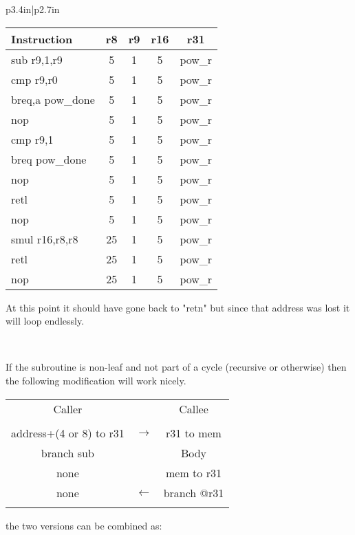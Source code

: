 \begin{tabular}{p{3.4in}|p{2.7in}}
\begin{tabular}{lcccc}
  Instruction & r8 & r9 & r16 & r31 \\ \hline
  sub r9,1,r9 & 5 & 1 & 5 & pow\_r \\
  cmp r9,r0 & 5 & 1 & 5 & pow\_r \\
  breq,a pow\_done & 5 & 1 & 5 & pow\_r \\
  nop & 5 & 1 & 5 & pow\_r \\
  cmp r9,1 & 5 & 1 & 5 & pow\_r \\
  breq pow\_done & 5 & 1 & 5 & pow\_r \\
  nop & 5 & 1 & 5 & pow\_r \\
  retl & 5 & 1 & 5 & pow\_r \\
  nop & 5 & 1 & 5 & pow\_r \\
  smul r16,r8,r8 & 25 & 1 & 5 & pow\_r \\
  retl & 25 & 1 & 5 & pow\_r \\
  nop & 25 & 1 & 5 & pow\_r \\
\end{tabular}

At this point it should have gone back to "retn" but since that address was lost it will loop endlessly.

\\
\end{tabular}

If the subroutine is non-leaf and not part of a cycle (recursive or otherwise) then the following modification will work nicely.
\vspace{6pt}

\begin{tabular}{|c|c|c|}
  \multicolumn{1}{c}{Caller} & \multicolumn{1}{c}{ } & \multicolumn{1}{c}{Callee} \\
  & & \\
  \cline{1-1} \cline{3-3}
  address+(4 or 8) to r31  & $\rightarrow$ & r31 to mem \\ \cline{3-3}
  branch sub     &   & Body \\ \cline{1-1} \cline{3-3}
  none           &   & mem to r31 \\
  none           & $\leftarrow$ & branch @r31 \\ \cline{1-1} \cline{3-3}
  & & \\
\end{tabular}

\vspace{6pt}
the two versions can be combined as:
\vspace{6pt}

